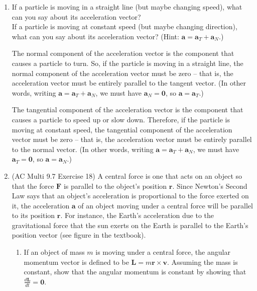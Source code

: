 \documentclass[10pt]{article}
\newcommand{\va}{\mathbf{a}}
\newcommand{\vv}{\mathbf{v}}
\newcommand{\vr}{\mathbf{r}}
\newcommand{\vF}{\mathbf{F}}
\newcommand{\vL}{\mathbf{L}}
\newenvironment{red}{\color{red}}{\ignorespacesafterend}
\begin{document}
\begin{enumerate}[leftmargin=0pt]
\item If a particle is moving in a straight line (but maybe changing speed), what can you say about its acceleration vector? \\
If a particle is moving at constant speed (but maybe changing direction), what can you say about its acceleration vector? (Hint: $\mathbf{a} = \mathbf{a}_T + \mathbf{a}_N$.)

\begin{red}
	The normal component of the acceleration vector is the component that causes a particle to turn. So, if the particle is moving in a straight line, the normal component of the acceleration vector must be zero -- that is, the acceleration vector must be entirely parallel to the tangent vector. (In other words, writing 
	$\mathbf{a} = \mathbf{a}_T + \mathbf{a}_N$, we must have 
	$\mathbf{a}_N = \mathbf{0}$, so 
	$\mathbf{a} = \mathbf{a}_T$.)

   The tangential component of the acceleration vector is the component that causes a particle to speed up or slow down. Therefore, if the particle is moving at constant speed, the tangential component of the acceleration vector must be zero -- that is, the acceleration vector must be entirely parallel to the normal vector. (In other words, writing 
    $\mathbf{a} = \mathbf{a}_T + \mathbf{a}_N$, we must have 
    $\mathbf{a}_T = \mathbf{0}$, so 
    $\mathbf{a} = \mathbf{a}_N$.)
\end{red}

\item (AC Multi 9.7 Exercise 18) A central force is one that acts on an object so that the force $\vF$ is parallel to the object's position $\vr$. Since Newton's Second Law says that an object's acceleration is proportional to the force exerted on it, the acceleration $\va$ of an object moving under a central force will be parallel to its position $\vr$. For instance, the Earth's acceleration due to the gravitational force that the sun exerts on the Earth is parallel to the Earth's position vector (see figure in the textbook).
	    
\begin{enumerate}
    \item If an object of mass $m$ is moving under a central force, the angular momentum vector is defined to be $\vL = m\vr \times \vv$. Assuming the mass is constant, show that the angular momentum is constant by showing that $\frac{d\vL}{dt} = \mathbf{0}$.
    

\end{enumerate}
\end{enumerate}
\end{document}
